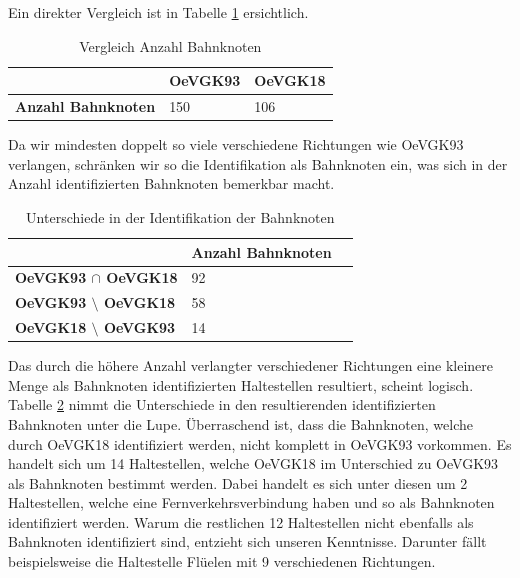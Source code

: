 Ein direkter Vergleich ist in Tabelle \ref{table:Vergleich Anzahl Bahnknoten} ersichtlich.

\begin{table}[H]
    \centering
    \begin{tabular}[c]{l l l}
        \toprule
        \textbf{}
                                & \textbf{OeVGK93}
                                & \textbf{OeVGK18}\\
        \midrule
        \textbf{Anzahl Bahnknoten}
                                & 150
                                & 106\\
        \bottomrule
    \end{tabular}
    \caption{Vergleich Anzahl Bahnknoten}
    \label{table:Vergleich Anzahl Bahnknoten}
\end{table}

Da wir mindesten doppelt so viele verschiedene Richtungen wie OeVGK93 verlangen, schränken wir so die Identifikation als Bahnknoten ein, was sich in der Anzahl identifizierten Bahnknoten bemerkbar macht.

\begin{table}[H]
    \centering
    \begin{tabular}[c]{l l l}
        \toprule
        \textbf{}
                                            & \textbf{Anzahl Bahnknoten}\\
        \midrule
        \textbf{OeVGK93 $\cap$ OeVGK18}       & 92\\
        \textbf{OeVGK93 $\setminus$ OeVGK18}  & 58\\
        \textbf{OeVGK18 $\setminus$ OeVGK93}  & 14\\
        \bottomrule
    \end{tabular}
    \caption{Unterschiede in der Identifikation der Bahnknoten}
    \label{table:Unterschiede in der Identifikation der Bahnknoten}
\end{table}

Das durch die höhere Anzahl verlangter verschiedener Richtungen eine kleinere Menge als Bahnknoten identifizierten Haltestellen resultiert, scheint logisch.
Tabelle \ref{table:Unterschiede in der Identifikation der Bahnknoten} nimmt die Unterschiede in den resultierenden identifizierten Bahnknoten unter die Lupe.
Überraschend ist, dass die Bahnknoten, welche durch OeVGK18 identifiziert werden, nicht komplett in OeVGK93 vorkommen.
Es handelt sich um 14 Haltestellen, welche OeVGK18 im Unterschied zu OeVGK93 als Bahnknoten bestimmt werden.
Dabei handelt es sich unter diesen um 2 Haltestellen, welche eine Fernverkehrsverbindung haben und so als Bahnknoten identifiziert werden.
Warum die restlichen 12 Haltestellen nicht ebenfalls als Bahnknoten identifiziert sind, entzieht sich unseren Kenntnisse.
Darunter fällt beispielsweise die Haltestelle Flüelen mit 9 verschiedenen Richtungen.

